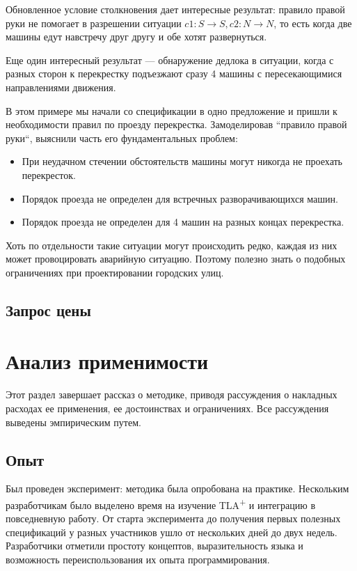 \documentclass[14pt, openany]{report}
\newcommand{\tlapl}{TLA\textsuperscript{+} }
\begin{document}
Обновленное условие столкновения дает интересные результат: правило правой руки не помогает в разрешении ситуации \(c1: S \rightarrow S, c2: N \rightarrow N \), то есть когда две машины едут навстречу друг другу и обе хотят развернуться. 


Еще один интересный результат --- обнаружение дедлока в ситуации, когда с разных сторон к перекрестку подъезжают сразу 4 машины с пересекающимися направлениями движения.

В этом примере мы начали со спецификации в одно предложение и пришли к необходимости правил по проезду перекрестка. Замоделировав ``правило правой руки``, выяснили часть его фундаментальных проблем:
\begin{itemize}
  \item При неудачном стечении обстоятельств машины могут никогда не проехать перекресток.
  \item Порядок проезда не определен для встречных разворачивающихся машин. 
  \item Порядок проезда не определен для 4 машин на разных концах перекрестка.
\end{itemize}

Хоть по отдельности такие ситуации могут происходить редко, каждая из них может провоцировать аварийную ситуацию. Поэтому полезно знать о подобных ограничениях при проектировании городских улиц.

\subsection{Запрос цены}

\section{Анализ применимости}
Этот раздел завершает рассказ о методике, приводя рассуждения о накладных расходах ее применения, ее достоинствах и ограничениях.
Все рассуждения выведены эмпирическим путем.

\subsection{Опыт}
Был проведен эксперимент: методика была опробована на практике. Нескольким разработчикам было выделено время на изучение \tlapl и интеграцию в повседневную работу. От старта эксперимента до получения первых полезных спецификаций у разных участников ушло от нескольких дней до двух недель. Разработчики отметили простоту концептов, выразительность языка и возможность переиспользования их опыта программирования. 
\end{document}
